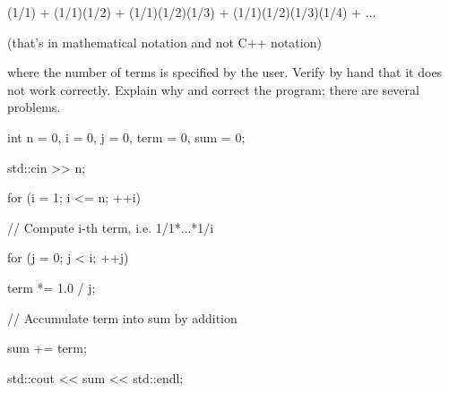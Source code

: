 \begin{center}

(1/1) + (1/1)(1/2) + (1/1)(1/2)(1/3) + (1/1)(1/2)(1/3)(1/4) + ...

\end{center}

(that's in mathematical notation and not C++ notation)

where the number of terms is specified by the user. Verify by hand that it does not work correctly. Explain why and correct the program; there are several problems.





\begin{console}

int n = 0, i = 0, j = 0, term = 0, sum = 0;



std::cin >> n;



for (i = 1; i <= n; ++i)

{    

     // Compute i-th term, i.e. 1/1*...*1/i

     for (j = 0; j < i; ++j)

     {    

          term *= 1.0 / j;

     }



     // Accumulate term into sum by addition

     sum += term;

}



std::cout << sum << std::endl;

\end{console}

